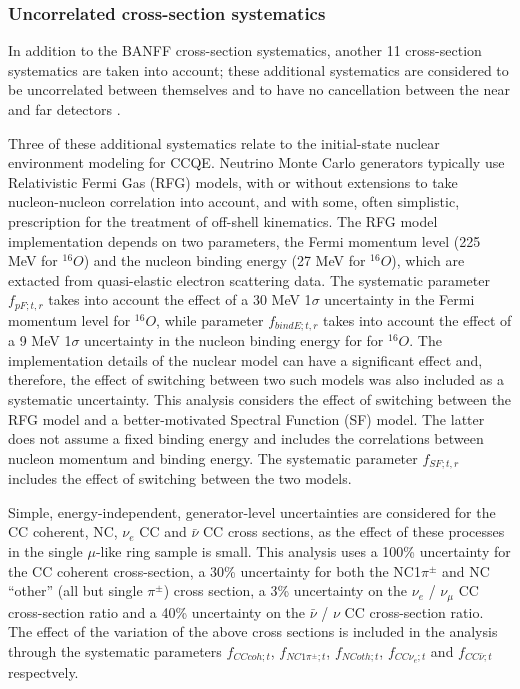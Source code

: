 \subsubsection {Uncorrelated cross-section systematics}
\label{sec:systematics:inputs:uncor_xsec}

In addition to the BANFF cross-section systematics,
another 11 cross-section systematics are taken into account; these additional systematics are considered to be uncorrelated 
between themselves and to have no cancellation between the near and far detectors \cite{NIWGErr} \cite{MoreNIWGErr113}.

Three of these additional systematics relate to the initial-state nuclear environment modeling for CCQE.
Neutrino Monte Carlo generators typically use Relativistic Fermi Gas (RFG) models,
with or without extensions to take nucleon-nucleon correlation into account, 
and with some, often simplistic, prescription for the treatment of off-shell kinematics.
The RFG model implementation depends on two parameters, the Fermi momentum level (225 MeV for $^{16}O$)
and the nucleon binding energy (27 MeV for $^{16}O$), which are extacted from quasi-elastic electron scattering data.
The systematic parameter $f_{pF; t, r}$ takes into account the effect of a 30 MeV 1$\sigma$ uncertainty in the Fermi momentum level
for $^{16}O$, while parameter $f_{bindE; t, r}$ takes into account the effect of a 9 MeV 1$\sigma$ uncertainty in the nucleon 
binding energy for for $^{16}O$.
The implementation details of the nuclear model can have a significant effect and, therefore,
the effect of switching between two such models was also included as a systematic uncertainty.
This analysis considers the effect of switching between the RFG model and a better-motivated 
Spectral Function (SF) model. The latter does not assume a fixed binding energy and includes the 
correlations between nucleon momentum and binding energy. The systematic parameter $f_{SF; t, r}$ 
includes the effect of switching between the two models.

Simple, energy-independent, generator-level uncertainties are considered for the CC coherent, NC, $\nu_e$ CC
and $\bar{\nu}$ CC cross sections, as the effect of these processes in the single $\mu$-like ring sample is small.
This analysis uses a 100\% uncertainty for the CC coherent cross-section, 
a 30\% uncertainty for both the NC1$\pi^\pm$ and NC ``other'' (all but single $\pi^\pm$) cross section,
a 3\% uncertainty on the $\nu_e$ / $\nu_\mu$ CC cross-section ratio and 
a 40\% uncertainty on the $\bar{\nu}$ / $\nu$ CC cross-section ratio.
The effect of the variation of the above cross sections is included in the analysis
through the systematic parameters $f_{CCcoh; t}$, $f_{NC1\pi^\pm; t}$, $f_{NCoth; t}$,
$f_{CC\nu_e; t}$ and $f_{CC\bar{\nu}; t}$ respectvely.

